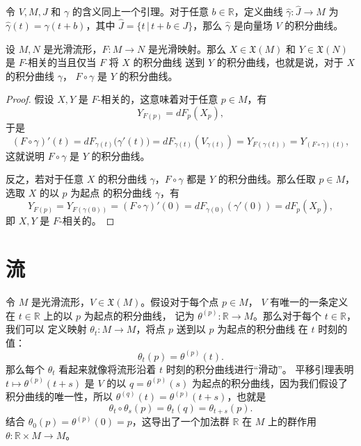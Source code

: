 \begin{lemma}[平移引理]
  令 $V,M,J$ 和 $\gamma$ 的含义同上一个引理。对于任意
  $b\in \mathbb{R}$，定义曲线 $\hat\gamma:\hat J\to M$
  为 $\hat \gamma(t)=\gamma(t+b)$，其中
  $\hat J=\{t\,|\, t+b\in J\}$，那么 $\hat \gamma$ 是向量场
  $V$ 的积分曲线。
\end{lemma}

\begin{proposition}[积分曲线的自然性]\label{prop:naturality of integral curve}
  设 $M,N$ 是光滑流形，$F:M\to N$ 是光滑映射。那么 $X\in \mathfrak{X}(M)$
  和 $Y\in \mathfrak{X}(N)$ 是 $F$-相关的当且仅当 $F$ 将 $X$ 的积分曲线
  送到 $Y$ 的积分曲线，也就是说，对于 $X$ 的积分曲线 $\gamma$，
  $F\circ\gamma$ 是 $Y$ 的积分曲线。
\end{proposition}
\begin{proof}
  假设 $X,Y$ 是 $F$-相关的，这意味着对于任意 $p\in M$，有
  \[
    Y_{F(p)}=dF_p(X_p),
  \]
  于是
  \[
    (F\circ\gamma)'(t)
    =dF_{\gamma(t)}\bigl(\gamma'(t)\bigr)
    =dF_{\gamma(t)}(V_{\gamma(t)})=Y_{F(\gamma(t))}
    =Y_{(F\circ\gamma)(t)},
  \]
  这就说明 $F\circ\gamma$ 是 $Y$ 的积分曲线。

  反之，若对于任意 $X$ 的积分曲线 $\gamma$，$F\circ\gamma$ 都是
  $Y$ 的积分曲线。那么任取 $p\in M$，选取 $X$ 的以 $p$ 为起点
  的积分曲线 $\gamma$，有
  \[
    Y_{F(p)}=Y_{F(\gamma(0))}=(F\circ\gamma)'(0)
    =dF_{\gamma(0)}(\gamma'(0))=dF_p(X_p),  
  \]
  即 $X,Y$ 是 $F$-相关的。
\end{proof}

\section{流}

令 $M$ 是光滑流形，$V\in \mathfrak{X}(M)$。假设对于每个点 $p\in M$，
$V$ 有唯一的一条定义在 $t\in \mathbb{R}$ 上的以 $p$ 为起点的积分曲线，
记为 $\theta^{(p)}:\mathbb{R}\to M$。那么对于每个 $t\in \mathbb{R}$，我们可以
定义映射 $\theta_t:M\to M$，将点 $p$ 送到以 $p$ 为起点的积分曲线
在 $t$ 时刻的值：
\[
  \theta_t(p)=\theta^{(p)}(t).  
\]
那么每个 $\theta_t$ 看起来就像将流形沿着 $t$ 时刻的积分曲线进行“滑动”。
平移引理表明 $t\mapsto \theta^{(p)}(t+s)$ 是 $V$ 的以 $q=\theta^{(p)}(s)$
为起点的积分曲线，因为我们假设了积分曲线的唯一性，所以
$\theta^{(q)}(t)=\theta^{(p)}(t+s)$，也就是
\[
  \theta_t\circ\theta_s(p)=\theta_t(q)=\theta_{t+s}(p).
\]
结合 $\theta_0(p)=\theta^{(p)}(0)=p$，这导出了一个加法群 $\mathbb{R}$
在 $M$ 上的群作用 $\theta:\mathbb{R}\times M\to M$。

